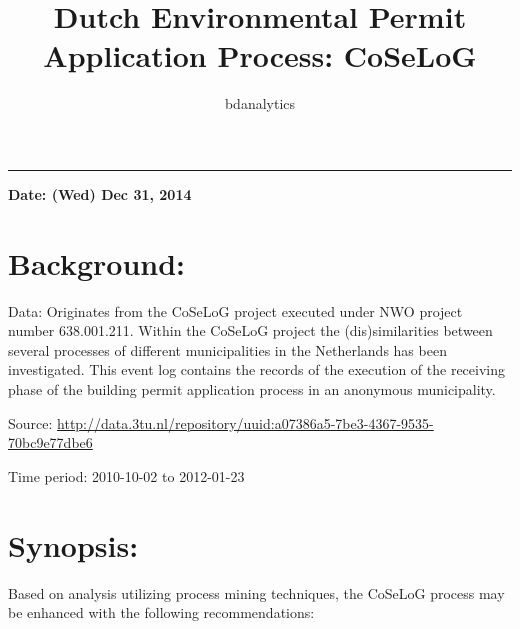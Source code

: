 \documentclass[]{article}
\title{Dutch Environmental Permit Application Process: CoSeLoG}
\author{bdanalytics}
\date{}
\begin{document}
\maketitle


{
\hypersetup{linkcolor=black}
\setcounter{tocdepth}{2}
\tableofcontents
}
\begin{center}\rule{0.5\linewidth}{\linethickness}\end{center}

\textbf{Date: (Wed) Dec 31, 2014}

\section{Background:}\label{background}

Data: Originates from the CoSeLoG project executed under NWO project
number 638.001.211. Within the CoSeLoG project the (dis)similarities
between several processes of different municipalities in the Netherlands
has been investigated. This event log contains the records of the
execution of the receiving phase of the building permit application
process in an anonymous municipality.

Source:
\url{http://data.3tu.nl/repository/uuid:a07386a5-7be3-4367-9535-70bc9e77dbe6}

Time period: 2010-10-02 to 2012-01-23

\section{Synopsis:}\label{synopsis}

Based on analysis utilizing process mining techniques, the CoSeLoG
process may be enhanced with the following recommendations:
\end{document}
